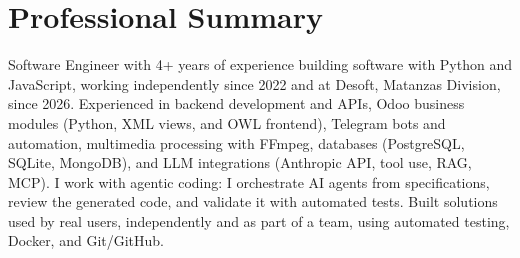 \section{Professional Summary}

Software Engineer with 4+ years of experience building software with Python and JavaScript, working independently since 2022 and at Desoft, Matanzas Division, since 2026. Experienced in backend development and APIs, Odoo business modules (Python, XML views, and OWL frontend), Telegram bots and automation, multimedia processing with FFmpeg, databases (PostgreSQL, SQLite, MongoDB), and LLM integrations (Anthropic API, tool use, RAG, MCP). I work with agentic coding: I orchestrate AI agents from specifications, review the generated code, and validate it with automated tests. Built solutions used by real users, independently and as part of a team, using automated testing, Docker, and Git/GitHub.
